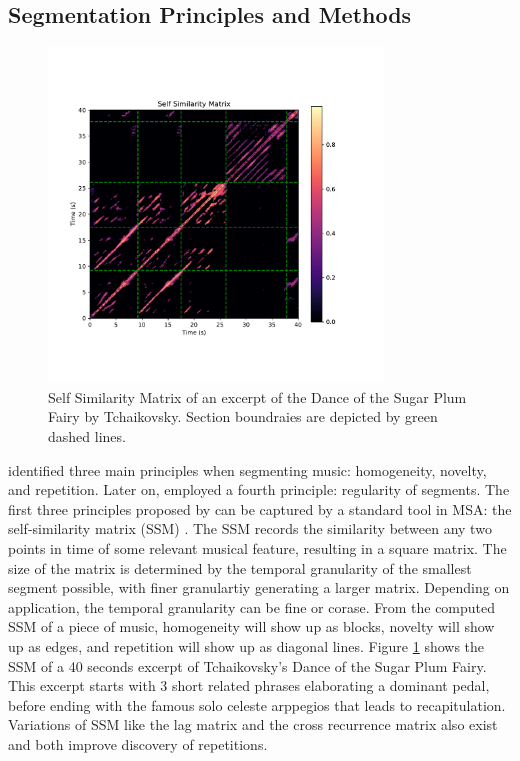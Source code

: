 
\subsection{Segmentation Principles and Methods}
\begin{figure}[H]
    \centering
    \includegraphics[height=3.5in]{ssm.pdf}
    \caption{Self Similarity Matrix of an excerpt of the Dance of the Sugar Plum Fairy by Tchaikovsky. Section boundraies are depicted by green dashed lines.}
    \label{fig:ssm}
\end{figure}
\cite{paulus2010audio} identified three main principles when segmenting music: homogeneity, novelty, and repetition.
Later on, \cite{sargent2011regularity} emplo­yed a fourth principle: regularity of segments.
The first three principles proposed by \citeauthor{paulus2010audio} can be captured by a standard tool in MSA: the self-similarity matrix (SSM) \citep{foote1999visualizing}.
The SSM records the similarity between any two points in time of some relevant musical feature, resulting in a square matrix.
The size of the matrix is determined by the temporal granularity of the smallest segment possible, with finer granulartiy generating a larger matrix.
Depending on application, the temporal granularity can be fine or corase.
From the computed SSM of a piece of music, homogeneity will show up as blocks, novelty will show up as edges, and repetition will show up as diagonal lines.
Figure \ref{fig:ssm} shows the SSM of a 40 seconds excerpt of Tchaikovsky's Dance of the Sugar Plum Fairy.
This excerpt starts with 3 short related phrases elaborating a dominant pedal, before ending with the famous solo celeste arppegios that leads to recapitulation.  
Variations of SSM like the lag matrix \citep{goto2003lag} and the cross recurrence matrix \citep{serra2009cross} also exist and both improve discovery of repetitions.

